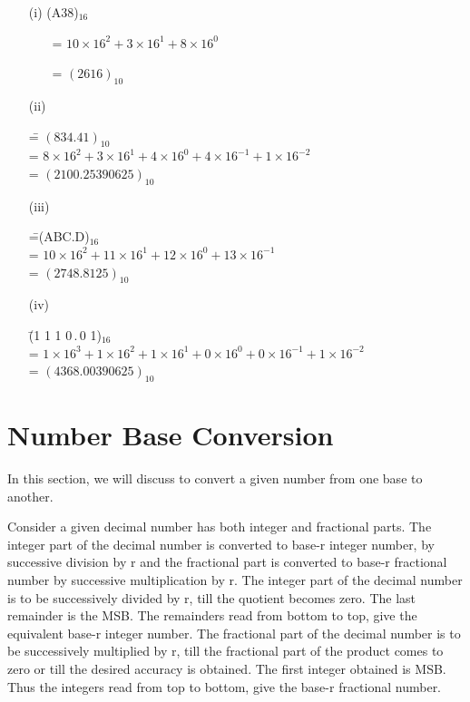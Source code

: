 \begin{solution}
\begin{itemize}
\item[(i)] (A38)$_{16}$

\qquad~~~ = $10\times 16^{2}+3\times 16^{1}+8\times 16^{0}$

\qquad~~~ = $(2616)_{10}$

\item[(ii)]
\begin{tabbing}
\== $(834.41)_{10}$\\[3pt]
\>= $8\times 16^{2}+3\times 16^{1}+4\times 16^{0}+4\times 16^{-1}+1\times 16^{-2}$\\[3pt]
\>= $(2100.25390625)_{10}$
\end{tabbing}

\item[(iii)] 
\begin{tabbing}
\==(ABC.D)$_{16}$\\[3pt]
\>= $10\times 16^{2}+11\times 16^{1}+12\times 16^{0}+13\times 16^{-1}$\\[3pt]
\>= $(2748.8125)_{10}$
\end{tabbing}

\item[(iv)] 
\begin{tabbing}
\=(1 1 1 0\,.\,0 1)$_{16}$\\[3pt]
\>= $1\times 16^{3}+1\times 16^{2}+1\times 16^{1}+0\times 16^{0}+0\times 16^{-1}+1\times 16^{-2}$\\[3pt]
\>= $(4368.00390625)_{10}$
\end{tabbing}
\end{itemize}
\end{solution}

\section{Number Base Conversion}\label{sec5.3}

In this section, we will discuss to convert a given number from one base to another.

\smallskip
{}

Consider a given decimal number has both integer and fractional parts. The integer part of the decimal number is converted to base-r integer number, by successive division by r and the fractional part is converted to base-r fractional number by successive multiplication by r. The integer part of the decimal number is to be successively divided by r, till the quotient becomes zero. The last remainder is the MSB. The remainders read from bottom to top, give the equivalent base-r integer number. The fractional part of the decimal number is to be successively multiplied by r, till the fractional part of the product comes to zero or till the desired accuracy is obtained. The first integer obtained is MSB. Thus the integers read from top to bottom, give the base-r fractional number.

